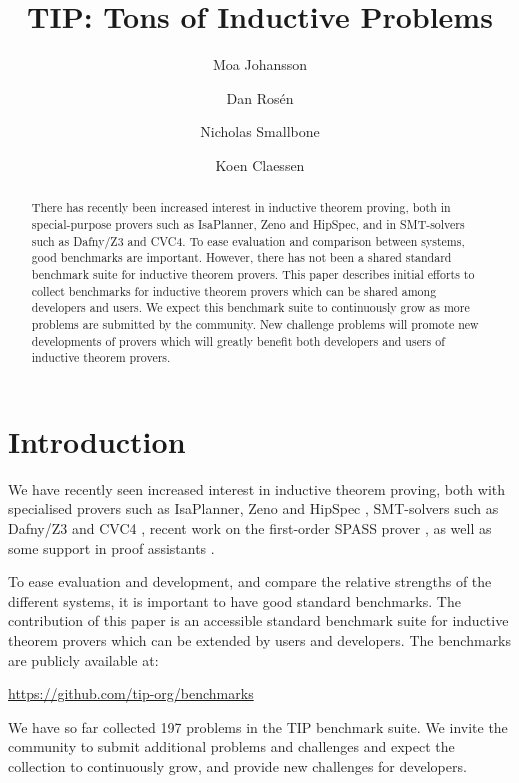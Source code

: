 \documentclass{llncs}
\begin{document}
\title{TIP: Tons of Inductive Problems}

\author{Moa Johansson \and Dan Ros\'en \and Nicholas Smallbone \and Koen Claessen}

\titlerunning{}

\maketitle

\begin{abstract}
There has recently been increased interest in inductive theorem
proving, both in special-purpose provers such as
IsaPlanner, Zeno and HipSpec, and in SMT-solvers such as
Dafny/Z3 and CVC4. To ease evaluation and comparison between systems,
good benchmarks are important. However, there has not been a shared
standard benchmark suite for inductive theorem provers. This paper
describes initial efforts to collect benchmarks for inductive theorem
provers which can be shared among developers and users. 
We expect this benchmark suite to continuously grow as
more problems are submitted by the community. New challenge problems
will promote new developments of provers which will greatly benefit
both developers and users of inductive theorem provers. 

\end{abstract}

\section{Introduction}

We have recently seen increased interest in inductive theorem proving, both with specialised provers such as IsaPlanner, Zeno and HipSpec \cite{dixon2007isaplanner,zeno,hipspecCADE}, SMT-solvers such as Dafny/Z3 and CVC4 \cite{dafny,cvc4}, recent work on the first-order SPASS prover \cite{SPASSInduction}, as well as some support in proof assistants \cite{acl2,hipster}. 

To ease evaluation and development, and compare the relative strengths of the different systems, it is important to have good standard benchmarks. The contribution of this paper is an accessible standard benchmark suite for inductive theorem provers which can be extended by users and developers. The benchmarks are publicly available at: 
\begin{center}
\url{https://github.com/tip-org/benchmarks}
\end{center}
We have so far collected 197 problems in the TIP benchmark suite. We invite the community to submit additional problems and challenges and expect the collection to continuously grow, and provide new challenges for developers. 
\end{document}
